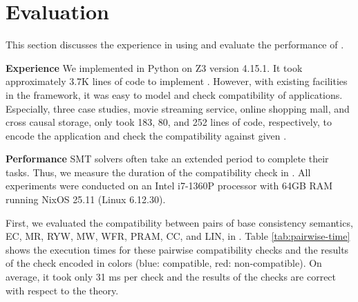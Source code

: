 \section{Evaluation} \label{sec:eval}
This section discusses the experience in using \sysname{} and
evaluate the performance of \sysname{}.

\textbf{Experience}
We implemented \sysname{} in Python on Z3 version 4.15.1. It took
approximately 3.7K lines of code to implement \sysname{}. However, with existing
facilities in the framework, it was easy to model and check compatibility of
applications. Especially, three case studies, movie streaming
service, online shopping mall, and cross causal storage, only took
183, 80, and 252 lines of code, respectively, to encode the
application and check the compatibility against given \sysmods{}.

\textbf{Performance}
SMT solvers often take an extended period to complete their tasks.
Thus, we measure the
duration of the compatibility check in \sysname{}.
All experiments were conducted on an Intel i7-1360P processor with
64GB RAM running NixOS 25.11 (Linux 6.12.30).


First, we evaluated the compatibility between pairs of base
consistency semantics,
EC, MR, RYW, MW, WFR, PRAM, CC, and LIN, in \sysname{}.
Table \ref{tab:pairwise-time} shows the execution times for these
pairwise compatibility checks and the results of the check encoded in
colors (blue: compatible, red: non-compatible). On average, it took
only 31 ms per check and the results of the checks are correct with
respect to the theory.


